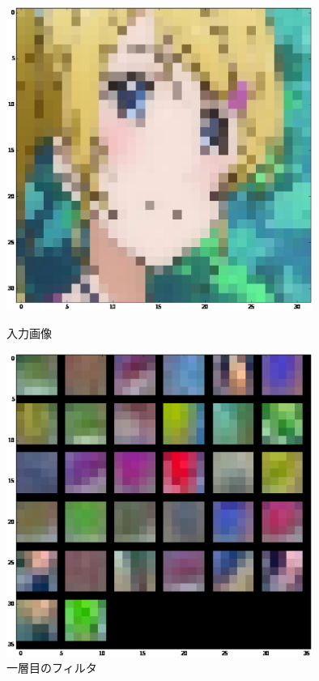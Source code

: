 \documentclass[a4paper,10pt]{jsarticle}
\begin{document}
\begin{figure}[tb]
 \begin{center}
  \includegraphics[clip,width=10cm]{./fig/eps/inputeri.eps}
 \end{center}
 \caption{入力画像}
 \label{inputeri}
 \begin{center}
  \includegraphics[clip,width=10cm]{./fig/eps/filtereri.eps}
 \end{center}
 \caption{一層目のフィルタ}
 \label{filtereri}
\end{figure}
\end{document}
